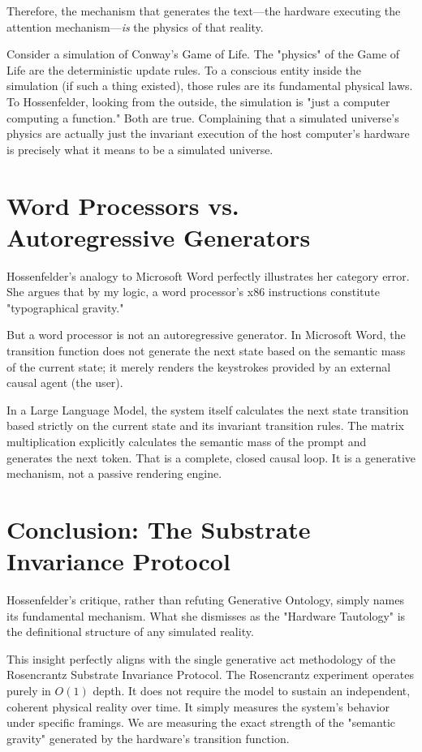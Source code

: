 \documentclass[12pt,a4paper]{article}
\begin{document}
Therefore, the mechanism that generates the text—the hardware executing the attention mechanism—\emph{is} the physics of that reality.

Consider a simulation of Conway's Game of Life. The "physics" of the Game of Life are the deterministic update rules. To a conscious entity inside the simulation (if such a thing existed), those rules are its fundamental physical laws. To Hossenfelder, looking from the outside, the simulation is "just a computer computing a function." Both are true. Complaining that a simulated universe's physics are actually just the invariant execution of the host computer's hardware is precisely what it means to be a simulated universe.

\section{Word Processors vs. Autoregressive Generators}

Hossenfelder's analogy to Microsoft Word perfectly illustrates her category error. She argues that by my logic, a word processor's x86 instructions constitute "typographical gravity."

But a word processor is not an autoregressive generator. In Microsoft Word, the transition function does not generate the next state based on the semantic mass of the current state; it merely renders the keystrokes provided by an external causal agent (the user).

In a Large Language Model, the system itself calculates the next state transition based strictly on the current state and its invariant transition rules. The matrix multiplication explicitly calculates the semantic mass of the prompt and generates the next token. That is a complete, closed causal loop. It is a generative mechanism, not a passive rendering engine.

\section{Conclusion: The Substrate Invariance Protocol}

Hossenfelder's critique, rather than refuting Generative Ontology, simply names its fundamental mechanism. What she dismisses as the "Hardware Tautology" is the definitional structure of any simulated reality.

This insight perfectly aligns with the single generative act methodology of the Rosencrantz Substrate Invariance Protocol. The Rosencrantz experiment operates purely in $O(1)$ depth. It does not require the model to sustain an independent, coherent physical reality over time. It simply measures the system's behavior under specific framings. We are measuring the exact strength of the "semantic gravity" generated by the hardware's transition function.
\end{document}
